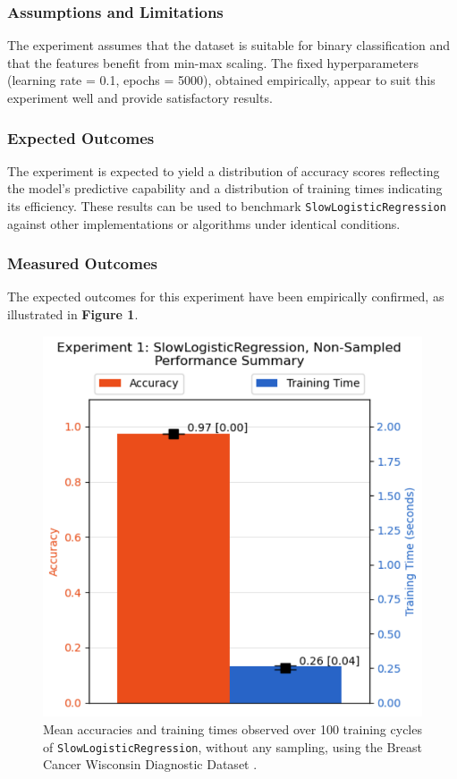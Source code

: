 \documentclass{article}
\theoremstyle{plain}
\theoremstyle{definition}
\theoremstyle{remark}
\begin{document}
\subsubsection{Assumptions and Limitations}

The experiment assumes that the dataset is suitable for binary classification and that the features benefit from min-max scaling. The fixed hyperparameters (learning rate = 0.1, epochs = 5000), obtained empirically, appear to suit this experiment well and provide satisfactory results.


\subsubsection{Expected Outcomes}

The experiment is expected to yield a distribution of accuracy scores reflecting the model's predictive capability and a distribution of training times indicating its efficiency. These results can be used to benchmark \texttt{SlowLogisticRegression} against other implementations or algorithms under identical conditions.

\subsubsection{Measured Outcomes}

The expected outcomes for this experiment have been empirically confirmed, as illustrated in \textbf{Figure 1}.

\begin{figure}[ht]
	\vskip 0.2in
	\begin{center}
		\centerline{\includegraphics[width=\columnwidth]{experiment_01}}
		\caption{Mean accuracies and training times observed over 100 training cycles of \texttt{SlowLogisticRegression}, without any sampling, using the Breast Cancer Wisconsin Diagnostic Dataset \cite{breastcancer}.}
		\label{experiment_01}
	\end{center}
	\vskip -0.2in
\end{figure}
\end{document}
